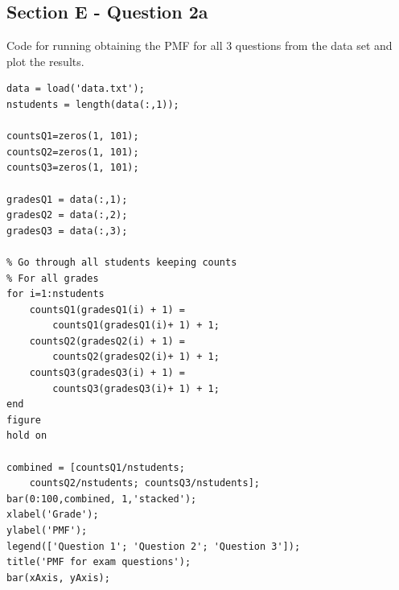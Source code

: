 \documentclass[10pt]{article}
\begin{document}
\subsection*{Section E - Question 2a}
Code for running obtaining the PMF for all 3 questions from the data set
and plot the results.
\begin{lstlisting}
data = load('data.txt');
nstudents = length(data(:,1));

countsQ1=zeros(1, 101);
countsQ2=zeros(1, 101);
countsQ3=zeros(1, 101);

gradesQ1 = data(:,1);
gradesQ2 = data(:,2);
gradesQ3 = data(:,3);

% Go through all students keeping counts
% For all grades
for i=1:nstudents
    countsQ1(gradesQ1(i) + 1) = 
        countsQ1(gradesQ1(i)+ 1) + 1; 
    countsQ2(gradesQ2(i) + 1) = 
        countsQ2(gradesQ2(i)+ 1) + 1; 
    countsQ3(gradesQ3(i) + 1) = 
        countsQ3(gradesQ3(i)+ 1) + 1; 
end
figure
hold on

combined = [countsQ1/nstudents; 
    countsQ2/nstudents; countsQ3/nstudents];
bar(0:100,combined, 1,'stacked');
xlabel('Grade');
ylabel('PMF');
legend(['Question 1'; 'Question 2'; 'Question 3']);
title('PMF for exam questions');
bar(xAxis, yAxis);
    
\end{lstlisting}
\end{document}
